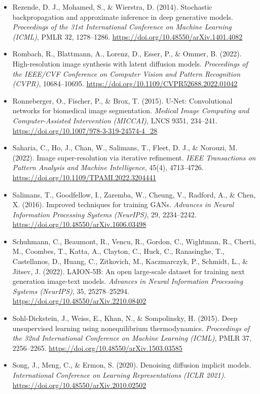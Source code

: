 \begin{itemize}[leftmargin=1.5em, label={}, itemsep=0.22ex, parsep=0pt]
    \item Rezende, D. J., Mohamed, S., \& Wierstra, D. (2014). Stochastic backpropagation and approximate inference in deep generative models. \textit{Proceedings of the 31st International Conference on Machine Learning (ICML)}, PMLR 32, 1278--1286. \url{https://doi.org/10.48550/arXiv.1401.4082}
    \item Rombach, R., Blattmann, A., Lorenz, D., Esser, P., \& Ommer, B. (2022). High-resolution image synthesis with latent diffusion models. \textit{Proceedings of the IEEE/CVF Conference on Computer Vision and Pattern Recognition (CVPR)}, 10684--10695. \url{https://doi.org/10.1109/CVPR52688.2022.01042}
    \item Ronneberger, O., Fischer, P., \& Brox, T. (2015). U-Net: Convolutional networks for biomedical image segmentation. \textit{Medical Image Computing and Computer-Assisted Intervention (MICCAI)}, LNCS 9351, 234--241. \url{https://doi.org/10.1007/978-3-319-24574-4_28}
    \item Saharia, C., Ho, J., Chan, W., Salimans, T., Fleet, D. J., \& Norouzi, M. (2022). Image super-resolution via iterative refinement. \textit{IEEE Transactions on Pattern Analysis and Machine Intelligence}, 45(4), 4713--4726. \url{https://doi.org/10.1109/TPAMI.2022.3204441}
    \item Salimans, T., Goodfellow, I., Zaremba, W., Cheung, V., Radford, A., \& Chen, X. (2016). Improved techniques for training GANs. \textit{Advances in Neural Information Processing Systems (NeurIPS)}, 29, 2234--2242. \url{https://doi.org/10.48550/arXiv.1606.03498}
    \item Schuhmann, C., Beaumont, R., Vencu, R., Gordon, C., Wightman, R., Cherti, M., Coombes, T., Katta, A., Clayton, C., Huck, C., Ranasinghe, T., Castellanos, D., Huang, C., Zitkovich, M., Kaczmarczyk, P., Schmidt, L., \& Jitsev, J. (2022). LAION-5B: An open large-scale dataset for training next generation image-text models. \textit{Advances in Neural Information Processing Systems (NeurIPS)}, 35, 25278--25294. \url{https://doi.org/10.48550/arXiv.2210.08402}
    \item Sohl-Dickstein, J., Weiss, E., Khan, N., \& Sompolinsky, H. (2015). Deep unsupervised learning using nonequilibrium thermodynamics. \textit{Proceedings of the 32nd International Conference on Machine Learning (ICML)}, PMLR 37, 2256--2265. \url{https://doi.org/10.48550/arXiv.1503.03585}
    \item Song, J., Meng, C., \& Ermon, S. (2020). Denoising diffusion implicit models. \textit{International Conference on Learning Representations (ICLR 2021)}. \url{https://doi.org/10.48550/arXiv.2010.02502}

\end{itemize}
